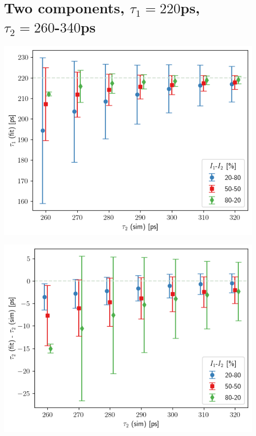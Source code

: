 \section{\boldmath Two components, $\tau_1 = 220$ps, $\tau_2=260$-$340$ps\unboldmath\label{t1-220}}

\begin{minipage}{ .47\linewidth}
    \includegraphics[width=\linewidth]{Batch 3/regular IRF/tau1 220/output/plotfin/t1.png}
    \label{fig:220-t1}
\end{minipage}
\hfill
\begin{minipage}{ .47\linewidth}
    \includegraphics[width=\linewidth]{Batch 3/regular IRF/tau1 220/output/plotfin/t2.png}
    \label{fig:220-t2}
\end{minipage}
